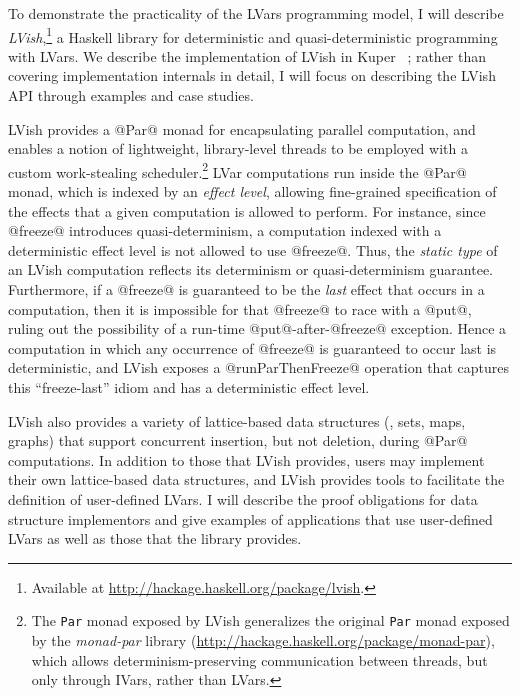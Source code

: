 \documentclass{article}
\begin{document}
To demonstrate the practicality of the LVars programming model, I will
describe \emph{LVish},\footnote{Available at
  \url{http://hackage.haskell.org/package/lvish}.} a Haskell library
for deterministic and quasi-deterministic programming with LVars.  We
describe the implementation of LVish in Kuper
\etal~\cite{Freeze-paper}; rather than covering implementation
internals in detail, I will focus on describing the LVish API through
examples and case studies.

LVish provides a @Par@ monad for encapsulating parallel computation,
and enables a notion of lightweight, library-level threads to be
employed with a custom work-stealing scheduler.\footnote{The
  \lstinline|Par| monad exposed by LVish generalizes the original
  \lstinline|Par| monad exposed by the \emph{monad-par} library
  ({\url{http://hackage.haskell.org/package/monad-par}}), which allows
  determinism-preserving communication between threads, but only
  through IVars, rather than LVars.}  LVar computations run inside the
@Par@ monad, which is indexed by an \emph{effect level}, allowing
fine-grained specification of the effects that a given computation is
allowed to perform.  For instance, since @freeze@ introduces
quasi-determinism, a computation indexed with a deterministic effect
level is not allowed to use @freeze@.  Thus, the \emph{static type} of
an LVish computation reflects its determinism or quasi-determinism
guarantee.  Furthermore, if a @freeze@ is guaranteed to be the
\emph{last} effect that occurs in a computation, then it is impossible
for that @freeze@ to race with a @put@, ruling out the possibility of
a run-time @put@-after-@freeze@ exception.  Hence a computation in
which any occurrence of @freeze@ is guaranteed to occur last is
deterministic, and LVish exposes a @runParThenFreeze@ operation that
captures this ``freeze-last'' idiom and has a deterministic effect
level.

LVish also provides a variety of lattice-based data structures (\eg,
sets, maps, graphs) that support concurrent insertion, but not
deletion, during @Par@ computations.  In addition to those that LVish
provides, users may implement their own lattice-based data structures,
and LVish provides tools to facilitate the definition of user-defined
LVars.  I will describe the proof obligations for data structure
implementors and give examples of applications that use user-defined
LVars as well as those that the library provides.
\end{document}
